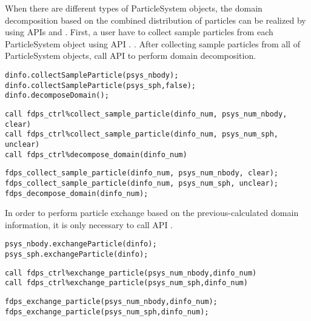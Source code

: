 When there are different types of \textsf{ParticleSystem} objects, the domain decomposition based on the combined distribution of particles can be realized by using APIs  and . First, a user have to collect sample particles from each \textsf{ParticleSystem} object using API . \textbf{}. After collecting sample particles from all of \textsf{ParticleSystem} objects, call API  to perform domain decomposition.

\ifCpp %
\begin{lstlisting}[caption=Domain decomposition]
dinfo.collectSampleParticle(psys_nbody);
dinfo.collectSampleParticle(psys_sph,false);
dinfo.decomposeDomain();
\end{lstlisting}
\endifCpp
\ifFtn %
\begin{lstlisting}[caption=Domain decomposition]
call fdps_ctrl%collect_sample_particle(dinfo_num, psys_num_nbody, clear)
call fdps_ctrl%collect_sample_particle(dinfo_num, psys_num_sph, unclear)
call fdps_ctrl%decompose_domain(dinfo_num)
\end{lstlisting}
\endifFtn
\ifC %
\begin{lstlisting}[caption=Domain decomposition]
fdps_collect_sample_particle(dinfo_num, psys_num_nbody, clear);
fdps_collect_sample_particle(dinfo_num, psys_num_sph, unclear);
fdps_decompose_domain(dinfo_num);
\end{lstlisting}
\endifC

In order to perform particle exchange based on the previous-calculated domain information, it is only necessary to call API .

\ifCpp %
\begin{lstlisting}[caption=Particle exchange]
psys_nbody.exchangeParticle(dinfo);
psys_sph.exchangeParticle(dinfo);
\end{lstlisting}
\endifCpp
\ifFtn %
\begin{lstlisting}[caption=Particle exchange]
call fdps_ctrl%exchange_particle(psys_num_nbody,dinfo_num)
call fdps_ctrl%exchange_particle(psys_num_sph,dinfo_num)
\end{lstlisting}
\endifFtn
\ifC %
\begin{lstlisting}[caption=Particle exchange]
fdps_exchange_particle(psys_num_nbody,dinfo_num);
fdps_exchange_particle(psys_num_sph,dinfo_num);
\end{lstlisting}
\endifC


